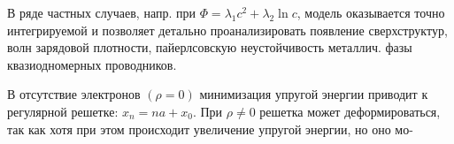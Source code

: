 \documentclass[10pt]{article}
\begin{document}
В ряде частных случаев, напр. при $\Phi=\lambda_{1} c^{2}+\lambda_{2} \ln c$, модель оказывается точно интегрируемой и позволяет детально проанализировать появление сверхструктур, волн зарядовой плотности, пайерлсовскую неустойчивость металлич. фазы квазиодномерных проводников.



В отсутствие электронов $(\rho=0)$ минимизация упругой энергии приводит к регулярной решетке: $x_{n}=n a+x_{0}$. При $\rho \neq 0$ решетка может деформироваться, так как хотя при этом происходит увеличение упругой энергии, но оно мо-
\end{document}
